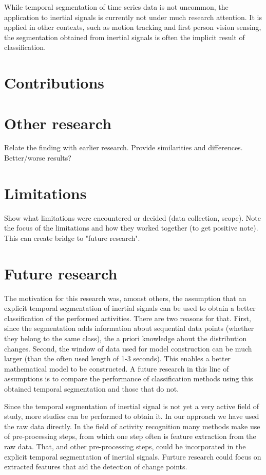 While temporal segmentation of time series data is not uncommon, the application to inertial signals is currently not under much research attention.
It is applied in other contexts, such as motion tracking and first person vision sensing, the segmentation obtained from inertial signals is often the implicit result of classification.

\section{Contributions}


\section{Other research}
Relate the finding with earlier research.
Provide similarities and differences.
Better/worse results?

\section{Limitations}
Show what limitations were encountered or decided (data collection, scope).
Note the focus of the limitations and how they worked together (to get positive note).
This can create bridge to "future research".

\section{Future research}
The motivation for this research was, amonst others, the assumption that an explicit temporal segmentation of inertial signals can be used to obtain a better classification of the performed activities.
There are two reasons for that.
First, since the segmentation adds information about sequential data points (whether they belong to the same class), the a priori knowledge about the distribution changes.
Second, the window of data used for model construction can be much larger (than the often used length of 1-3 seconds).
This enables a better mathematical model to be constructed.
A future research in this line of assumptions is to compare the performance of classification methods using this obtained temporal segmentation and those that do not.

Since the temporal segmentation of inertial signal is not yet a very active field of study, more studies can be performed to obtain it.
In our approach we have used the raw data directly.
In the field of activity recognition many methods make use of pre-processing steps, from which one step often is feature extraction from the raw data.
That, and other pre-processing steps, could be incorporated in the explicit temporal segmentation of inertial signals.
Furture research could focus on extracted features that aid the detection of change points.


